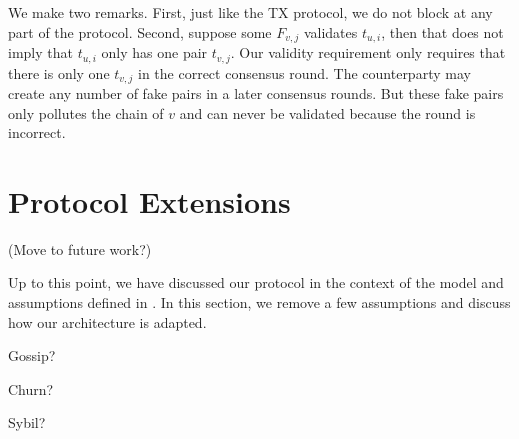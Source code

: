 We make two remarks.
First, just like the TX protocol, we do not block at any part of the protocol.
Second, suppose some $F_{v, j}$ validates $t_{u, i}$, then that does not imply that $t_{u, i}$ only has one pair $t_{v, j}$.
Our validity requirement only requires that there is only one $t_{v, j}$ in the correct consensus round.
The counterparty may create any number of fake pairs in a later consensus rounds.
But these fake pairs only pollutes the chain of $v$ and can never be validated because the round is incorrect.

\section{Protocol Extensions}
\label{sec:protocol-extensions}

(Move to future work?)

Up to this point, we have discussed our protocol in the context of the model and assumptions defined in .
In this section, we remove a few assumptions and discuss how our architecture is adapted.

Gossip?

Churn?

Sybil?



